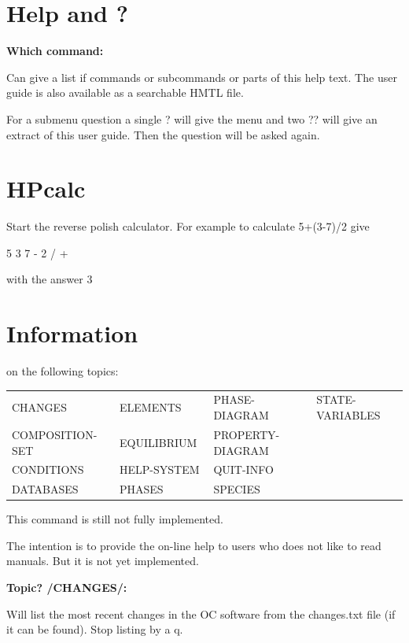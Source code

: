 \documentclass[11pt]{article}
\begin{document}
\section{Help and ?}

{\bf Which command:}

Can give a list if commands or subcommands or parts of this help text.
The user guide is also available as a searchable HMTL file.

For a submenu question a single ? will give the menu and two ?? will
give an extract of this user guide.  Then the question will be asked
again.

\section{HPcalc }

Start the reverse polish calculator.  For example to calculate 5+(3-7)/2
give

5 3 7 - 2 / +

with the answer 3

\hypertarget{Info}{}
\hypertarget{Topic?changes}{}
\hypertarget{Topic?quit}{}
\section{Information }

on the following topics:

\begin{tabular}{llll}
 CHANGES         & ELEMENTS     & PHASE-DIAGRAM~   & STATE-VARIABLES\\ 
 COMPOSITION-SET~& EQUILIBRIUM~ & PROPERTY-DIAGRAM~\\
 CONDITIONS      & HELP-SYSTEM  & QUIT-INFO\\
 DATABASES       & PHASES       & SPECIES\\
\end{tabular}

This command is still not fully implemented.

The intention is to provide the on-line help to users who does not
like to read manuals.  But it is not yet implemented.

{\bf Topic? /CHANGES/:}

Will list the most recent changes in the OC software from the
changes.txt file (if it can be found).  Stop listing by a q.
\end{document}
